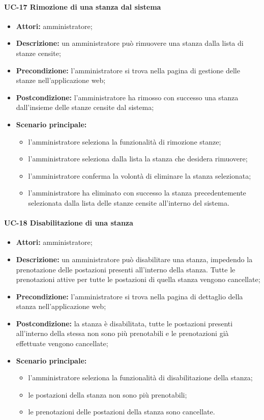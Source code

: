 \paragraph{UC-17 Rimozione di una stanza dal sistema}
\begin{itemize}
    \item \textbf{Attori:} amministratore;
    \item \textbf{Descrizione:} un amministratore pu\`{o} rimuovere una stanza dalla lista di stanze censite;
    \item \textbf{Precondizione:} l'amministratore si trova nella pagina di gestione delle stanze nell'applicazione web;
    \item \textbf{Postcondizione:} l'amministratore ha rimosso con successo una stanza dall'insieme delle stanze censite dal sistema;
    \item \textbf{Scenario principale:}
    \begin{itemize}
        \item l'amministratore seleziona la funzionalità di rimozione stanze;
        \item l'amministratore seleziona dalla lista la stanza che desidera rimuovere;
        \item l'amministratore conferma la volontà di eliminare la stanza selezionata;
        \item l'amministratore ha eliminato con successo la stanza precedentemente selezionata dalla lista delle stanze censite all'interno del sistema.
    \end{itemize}
\end{itemize}

\paragraph{UC-18 Disabilitazione di una stanza}
\begin{itemize}
    \item \textbf{Attori:} amministratore;
    \item \textbf{Descrizione:} un amministratore pu\`{o} disabilitare una stanza, impedendo la prenotazione delle postazioni presenti all'interno della stanza. Tutte le prenotazioni attive per tutte le postazioni di quella stanza vengono cancellate;
    \item \textbf{Precondizione:} l'amministratore si trova nella pagina di dettaglio della stanza nell'applicazione web;
    \item \textbf{Postcondizione:} la stanza \`{e} disabilitata, tutte le postazioni presenti all'interno della stessa non sono pi\`{u} prenotabili e le prenotazioni già effettuate vengono cancellate;
    \item \textbf{Scenario principale:}
    \begin{itemize}
        \item l'amministratore seleziona la funzionalità di disabilitazione della stanza;
        \item le postazioni della stanza non sono pi\`{u} prenotabili;
        \item le prenotazioni delle postazioni della stanza sono cancellate.
    \end{itemize}
\end{itemize}

